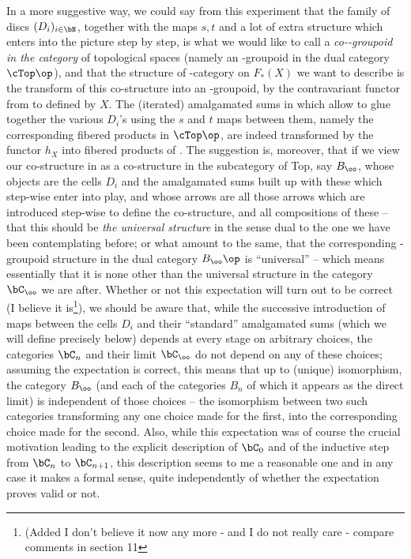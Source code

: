 In a more suggestive way, we could say from this
experiment that the family of discs $(D_i)_{i\in\bN}$, together with
the maps $s,t$ and a lot of extra structure which enters into the
picture step by step, is what we would like to call a
\emph{co-\oo-groupoid in the category} \cTop{} of topological spaces
(namely an \oo-groupoid in the dual category $\cTop\op$), and
that the structure of \oo-category on $F_*(X)$ we want to describe is
the transform of this co-structure into an \oo-groupoid, by the
contravariant functor from \cTop{} to \Sets{} defined by $X$. The
(iterated) amalgamated sums in \cTop{} which allow to glue together the
various $D_i$'s using the $s$ and $t$ maps between them, namely the
corresponding fibered products in $\cTop\op$, are indeed
transformed by the functor $h_X$ into fibered products of \Sets.
The suggestion is, moreover, that if we view our co-structure in \cTop{}
as a co-structure in the subcategory of Top, say $B_\oo$, whose
objects are the cells $D_i$ and the amalgamated sums built up with
these which step-wise enter into play, and whose arrows are all those
arrows which are introduced step-wise to define the co-structure, and
all compositions of these -- that this should be \emph{the universal
  structure} in the sense dual to the one we have been contemplating
before; or what amount to the same, that the corresponding
\oo-groupoid structure in the dual category $B_\oo\op$ is
``universal'' -- which means essentially that it is none other than
the universal structure in the category $\bC_\oo$ we are
after. Whether or not this expectation will turn out to be correct (I
believe it is\footnote{(Added  I don't believe it now any more - and I do not really care - compare comments in section 11}), we should be aware that, while the successive
introduction of maps between the cells $D_i$ and their ``standard''
amalgamated sums (which we will define precisely below) depends at
every stage on arbitrary choices, the categories $\bC_n$ and their
limit $\bC_\oo$ do not depend on any of these choices; assuming the
expectation is correct, this means that up to (unique) isomorphism,
the category $B_\oo$ (and each of the categories $B_n$ of which it
appears as the direct limit) is independent of those choices -- the
isomorphism between two such categories transforming any one choice
made for the first, into the corresponding choice made for the
second. Also, while this expectation was of course the crucial
motivation leading to the explicit description of $\bC_0$ and of
the inductive step from $\bC_n$ to $\bC_{n+1}$, this description
seems to me a reasonable one and in any case it makes a formal sense,
quite independently of whether the expectation proves valid or not.

